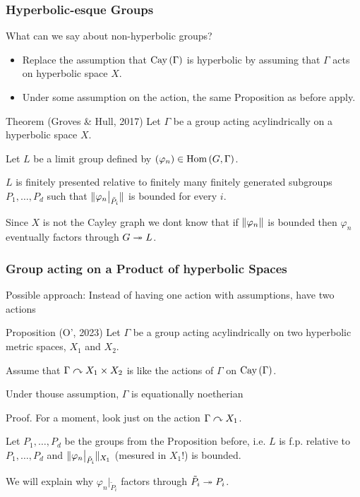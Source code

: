 \documentclass{beamer}[10]
\renewcommand{\hom}{\text{Hom}}
\begin{document}
\begin{frame}
    \frametitle{Hyperbolic-esque Groups}
    What can we say about non-hyperbolic groups?
    \pause

    \begin{itemize}
        \item Replace the assumption that $\operatorname{Cay}\left(  \Gamma  \right)$ is hyperbolic by assuming that $\Gamma$ acts on hyperbolic space $X$.
        \item \pause Under some assumption on the action, the same Proposition as before apply.
    \end{itemize}
    \pause
    \begin{block}{Theorem (Groves \& Hull, 2017)}
        \pause Let $\Gamma$ be a group acting acylindrically on a hyperbolic space $X$. \pause  
        
        Let $L$ be a limit group defined by $\rb{\varphi_n} \in \hom\rb{G,\Gamma}$. \\ \pause
        
        $L$ is finitely presented relative to finitely many finitely generated subgroups $P_1, \ldots, P_d$ such that $\lVert \varphi_{n}\big\vert_{\tilde{P}_i} \rVert$ is bounded for every $i$.
    \end{block}
    \pause


    Since $X$ is not the Cayley graph we dont know that if $\lVert \varphi_n \rVert$ is bounded then $\varphi_n$ eventually factors through $G\twoheadrightarrow L$.
\end{frame}

\begin{frame}
    \frametitle{Group acting on a Product of hyperbolic Spaces}
    {\Large Possible approach: Instead of having one action with assumptions, have two actions}\pause  
    \begin{block}{Proposition (O', 2023)}
        Let $\Gamma$ be a group acting acylindrically on two hyperbolic metric spaces, $X_1$ and $X_2$.\pause
            
        Assume that $\Gamma \curvearrowright X_1 \times X_2$ is like the actions of $\Gamma$ on $\operatorname{Cay}\left( \Gamma \right)$.\pause

        Under thouse assumption, $\Gamma$ is equationally noetherian
    \end{block}\pause

    \begin{block}{Proof.}\pause
        For a moment, look just on the action $\Gamma \curvearrowright X_1$.\pause 

        Let $P_1, \ldots, P_d$ be the groups from the Proposition before\pause, i.e. $L$ is f.p. relative to $P_1, \ldots, P_d$ and $\lVert \varphi_{n}\big\vert_{\tilde{P}_i} \rVert_{X_1}$ (mesured in $X_1$!) is bounded.\pause

         We will explain why $\varphi_{n}\big\vert_{\tilde{P}_i}$ factors through $\tilde{P}_i \twoheadrightarrow P_i$. 
    \end{block}
    
    
\end{frame}
\end{document}
